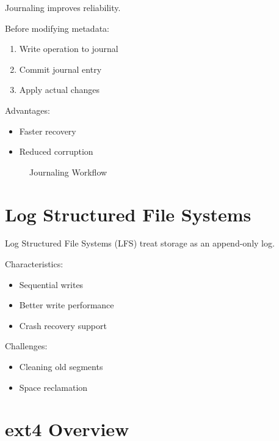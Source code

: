 Journaling improves reliability.

Before modifying metadata:

\begin{enumerate}
\item Write operation to journal
\item Commit journal entry
\item Apply actual changes
\end{enumerate}

Advantages:

\begin{itemize}
\item Faster recovery
\item Reduced corruption
\end{itemize}

\begin{figure}[H]
\centering
{}
\caption{Journaling Workflow}
\end{figure}

\section{Log Structured File Systems}

Log Structured File Systems (LFS) treat storage as an append-only log.

Characteristics:

\begin{itemize}
\item Sequential writes
\item Better write performance
\item Crash recovery support
\end{itemize}

Challenges:

\begin{itemize}
\item Cleaning old segments
\item Space reclamation
\end{itemize}

\section{ext4 Overview}

